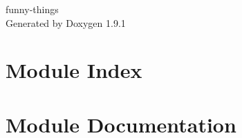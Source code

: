 \let\mypdfximage\pdfximage\def\pdfximage{\immediate\mypdfximage}\documentclass[twoside]{book}
\newcommand{\+}{\discretionary{\mbox{\scriptsize$\hookleftarrow$}}{}{}}
\newcommand{\clearemptydoublepage}{%
  \newpage{\pagestyle{empty}\cleardoublepage}%
}
\begin{document}
\raggedbottom

\begin{titlepage}
\vspace*{7cm}
\begin{center}%
{\Large funny-\/things }\\
\vspace*{1cm}
{\large Generated by Doxygen 1.9.1}\\
\end{center}
\end{titlepage}
\clearemptydoublepage
{}
\tableofcontents
\clearemptydoublepage
{}

\chapter{Module Index}

\chapter{Module Documentation}




\backmatter
\newpage
{}
\clearemptydoublepage
{}
\printindex
\end{document}
